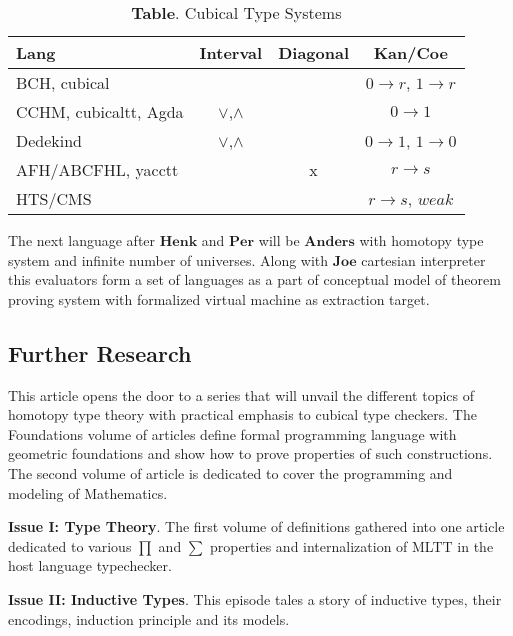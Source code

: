 \documentclass{article}
\theoremstyle{definition}
\begin{document}
\begin{table}[!ht]
  \centering
  \caption*{\textbf{Table}. Cubical Type Systems}
  \begin{adjustbox}{width=\columnwidth,center}
  \begin{tabular}{lccc}
    \hline
       Lang & Interval & Diagonal & Kan/Coe\\
    \hline
       BCH, cubical        & & & $0\rightarrow r$, $1 \rightarrow r$\\
       CCHM, cubicaltt, Agda       & $\lor$,$\land$ & & $0 \rightarrow 1$\\
       Dedekind          & $\lor$,$\land$ & & $0 \rightarrow 1$, $1 \rightarrow 0$\\
       AFH/ABCFHL, yacctt & & x & $r \rightarrow s$\\
       HTS/CMS    & &   & $r \rightarrow s$, $weak$\\
  \end{tabular}
  \end{adjustbox}
\end{table}

The next language after $\mathbf{Henk}$ and $\mathbf{Per}$ will
be $\mathbf{Anders}$ with homotopy type system and infinite number of universes.
Along with $\mathbf{Joe}$ cartesian interpreter this evaluators form a set of
languages as a part of conceptual model of theorem proving system with
formalized virtual machine as extraction target.

\newpage
\subsection*{Further Research}

This article opens the door to a series that will unvail the different topics of
homotopy type theory with practical emphasis to cubical type checkers.
The Foundations volume of articles define formal programming language
with geometric foundations and show how to prove properties of such constructions.
The second volume of article is dedicated to cover the programming and modeling of Mathematics.

{\bf Issue I: Type Theory}.
The first volume of definitions gathered into one article dedicated to
various $\prod$ and $\sum$ properties and internalization of MLTT in the host language typechecker.

{\bf Issue II: Inductive Types}.
This episode tales a story of inductive types, their encodings,
induction principle and its models.
\end{document}
